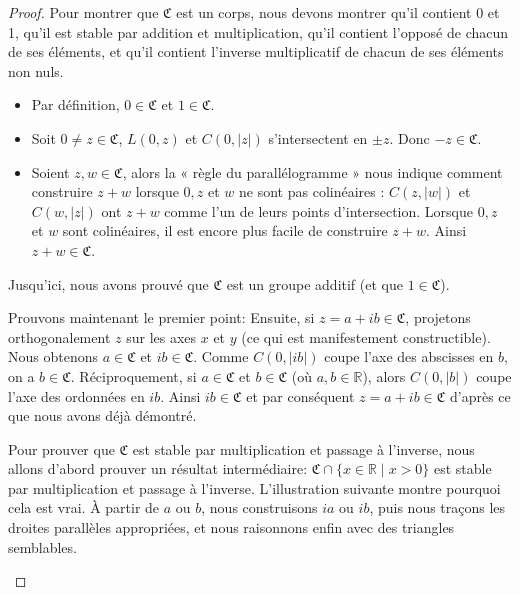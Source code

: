 \documentclass[math, info]{mpb-cours}
\def\fC{\mathfrak{C}}
\begin{document}
\begin{proof}
	Pour montrer que $\fC$ est un corps, nous devons montrer qu'il contient 0 et 1, qu'il est stable par
	addition et multiplication, qu'il contient l'opposé de chacun de ses éléments, et qu'il contient
	l'inverse multiplicatif de chacun de ses éléments non nuls.

	\begin{itemize}
		\item Par définition, $0 \in \fC$ et $1 \in \fC$.
		\item Soit $0 \neq z \in \fC$, $L(0, z)$ et $C(0, |z|)$ s'intersectent en $\pm z$. Donc $-z \in \fC$.
		\item Soient $z, w \in \fC$, alors la « règle du parallélogramme » nous indique comment construire
		      $z + w$ lorsque $0, z$ et $w$ ne sont pas colinéaires : $C(z, |w|)$ et $C(w, |z|)$ ont $z + w$
		      comme l'un de leurs points d'intersection. Lorsque $0, z$ et $w$ sont colinéaires,
		      il est encore plus facile de construire $z + w$. Ainsi $z + w \in \fC$.
	\end{itemize}

	Jusqu'ici, nous avons prouvé que $\fC$ est un groupe additif (et que $1 \in \fC$).

	Prouvons maintenant le premier point:
	Ensuite, si $z = a + ib \in \fC$, projetons orthogonalement $z$ sur les axes $x$ et $y$
	(ce qui est manifestement constructible).
	Nous obtenons $a \in \fC$ et $ib \in \fC$.
	Comme $C(0, |ib|)$ coupe l'axe des abscisses en $b$, on a $b \in \fC$.
	Réciproquement, si $a \in \fC$ et $b \in \fC$ (où $a, b \in \mathbb{R}$), alors $C(0, |b|)$ coupe l'axe
	des ordonnées en $ib$.
	Ainsi $ib \in \fC$ et par conséquent $z = a + ib \in \fC$ d'après ce que nous avons déjà démontré.

	\smallskip

	Pour prouver que $\fC$ est stable par multiplication et passage à l'inverse, nous allons d'abord prouver
	un résultat intermédiaire: $\fC \cap \{x \in \mathbb{R} \mid x > 0\}$ est stable par multiplication et
	passage à l'inverse.
	L'illustration suivante montre pourquoi cela est vrai.
	À partir de $a$ ou $b$, nous construisons $ia$ ou $ib$, puis nous traçons les droites parallèles
	appropriées, et nous raisonnons enfin avec des triangles semblables.

	\begin{center}
		\begin{tikzpicture}[scale=1.2, >=stealth, every node/.style={scale=0.9}]


\end{tikzpicture}
\end{center}
\end{proof}
\end{document}
